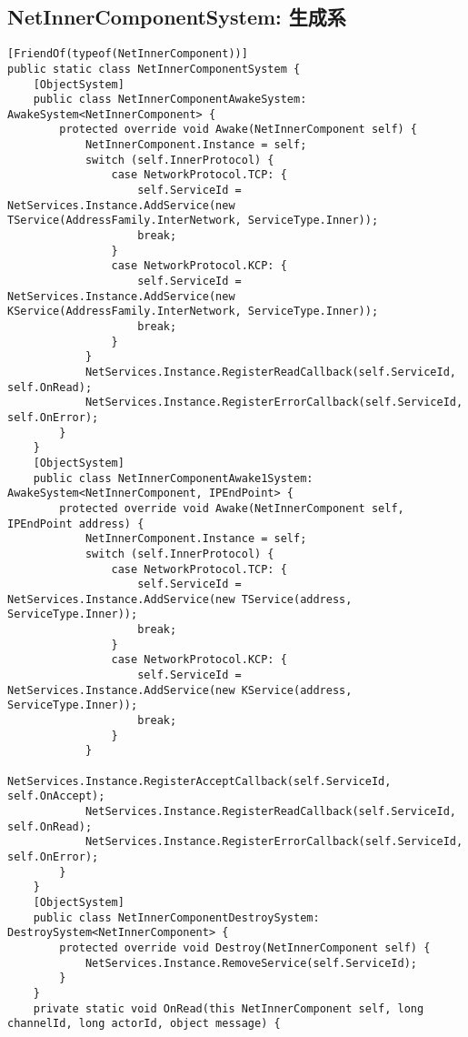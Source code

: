 \documentclass[9pt, b5paper]{article}
\begin{document}
\subsection{NetInnerComponentSystem: 生成系}
\label{sec-1-2}
\begin{verbatim}
[FriendOf(typeof(NetInnerComponent))]
public static class NetInnerComponentSystem {
    [ObjectSystem]
    public class NetInnerComponentAwakeSystem: AwakeSystem<NetInnerComponent> {
        protected override void Awake(NetInnerComponent self) {
            NetInnerComponent.Instance = self;
            switch (self.InnerProtocol) {
                case NetworkProtocol.TCP: {
                    self.ServiceId = NetServices.Instance.AddService(new TService(AddressFamily.InterNetwork, ServiceType.Inner));
                    break;
                }
                case NetworkProtocol.KCP: {
                    self.ServiceId = NetServices.Instance.AddService(new KService(AddressFamily.InterNetwork, ServiceType.Inner));
                    break;
                }
            }
            NetServices.Instance.RegisterReadCallback(self.ServiceId, self.OnRead);
            NetServices.Instance.RegisterErrorCallback(self.ServiceId, self.OnError);
        }
    }
    [ObjectSystem]
    public class NetInnerComponentAwake1System: AwakeSystem<NetInnerComponent, IPEndPoint> {
        protected override void Awake(NetInnerComponent self, IPEndPoint address) {
            NetInnerComponent.Instance = self;
            switch (self.InnerProtocol) {
                case NetworkProtocol.TCP: {
                    self.ServiceId = NetServices.Instance.AddService(new TService(address, ServiceType.Inner));
                    break;
                }
                case NetworkProtocol.KCP: {
                    self.ServiceId = NetServices.Instance.AddService(new KService(address, ServiceType.Inner));
                    break;
                }
            }
            NetServices.Instance.RegisterAcceptCallback(self.ServiceId, self.OnAccept);
            NetServices.Instance.RegisterReadCallback(self.ServiceId, self.OnRead);
            NetServices.Instance.RegisterErrorCallback(self.ServiceId, self.OnError);
        }
    }
    [ObjectSystem]
    public class NetInnerComponentDestroySystem: DestroySystem<NetInnerComponent> {
        protected override void Destroy(NetInnerComponent self) {
            NetServices.Instance.RemoveService(self.ServiceId);
        }
    }
    private static void OnRead(this NetInnerComponent self, long channelId, long actorId, object message) {

\end{verbatim}
\end{document}
